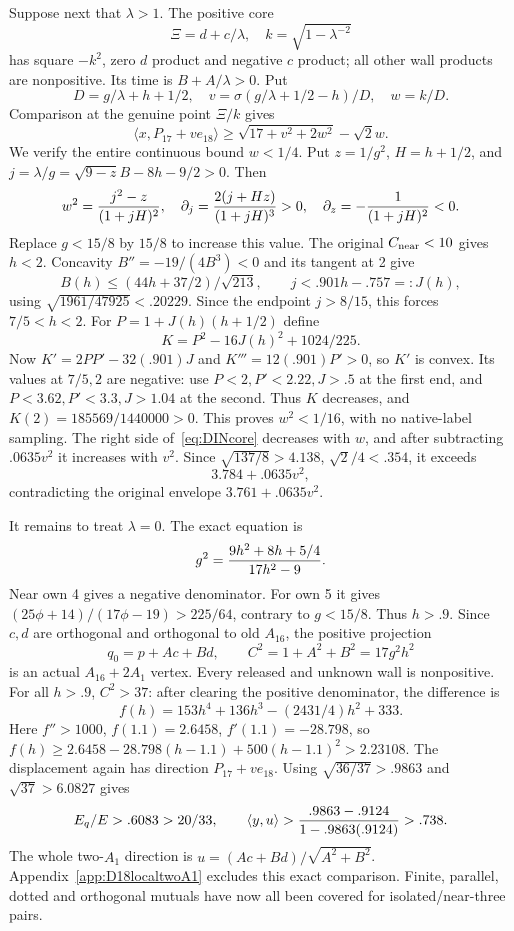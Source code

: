 \documentclass[11pt]{article}
\theoremstyle{definition}
\theoremstyle{remark}
\newcommand{\ip}[2]{\langle #1,#2\rangle}
\begin{document}
Suppose next that \(\lambda>1\).
The positive core
\[
 \Xi=d+c/\lambda,\quad k=\sqrt{1-\lambda^{-2}}
\]
has square \(-k^2\), zero \(d\) product and negative \(c\)
product; all other wall products are nonpositive.
Its time is \(B+A/\lambda>0\).
Put
\[
 D=g/\lambda+h+1/2,\quad
 v=\sigma(g/\lambda+1/2-h)/D,\quad w=k/D.
\]
Comparison at the genuine point \(\Xi/k\) gives
\[
 \ip x{P_{17}+ve_{18}}
 \ge\sqrt{17+v^2+2w^2}-\sqrt2w .
\tag{DINcore}\label{eq:DINcore}
\]
We verify the entire continuous bound \(w<1/4\).
Put \(z=1/g^2\), \(H=h+1/2\), and
\(j=\lambda/g=\sqrt{9-z}B-8h-9/2>0\).
Then
\[
 w^2={j^2-z\over(1+jH)^2},\quad
 \partial_j={2(j+Hz)\over(1+jH)^3}>0,\quad
 \partial_z=-{1\over(1+jH)^2}<0 .
\]
Replace \(g<15/8\) by \(15/8\) to increase this value.
The original \(C_{\rm near}<10\) gives \(h<2\).
Concavity \(B''=-19/(4B^3)<0\) and its tangent at 2 give
\[
 B(h)\le(44h+37/2)/\sqrt{213},\qquad
 j<.901h-.757=:J(h),
\]
using \(\sqrt{1961/47925}<.20229\).
Since the endpoint \(j>8/15\), this forces \(7/5<h<2\).
For \(P=1+J(h)(h+1/2)\) define
\[
 K=P^2-16J(h)^2+1024/225 .
\]
Now \(K'=2PP'-32(.901)J\) and
\(K'''=12(.901)P'>0\), so \(K'\) is convex.
Its values at \(7/5,2\) are negative:
use \(P<2,P'<2.22,J>.5\) at the first end,
and \(P<3.62,P'<3.3,J>1.04\) at the second.
Thus \(K\) decreases, and
\(K(2)=185569/1440000>0\).
This proves \(w^2<1/16\), with no native-label sampling.
The right side of~\eqref{eq:DINcore} decreases with \(w\),
and after subtracting \(.0635v^2\) it increases with \(v^2\).
Since \(\sqrt{137/8}>4.138\), \(\sqrt2/4<.354\), it exceeds
\[
                3.784+.0635v^2,
\]
contradicting the original envelope
\(3.761+.0635v^2\).

It remains to treat \(\lambda=0\).
The exact equation is
\[
 g^2={9h^2+8h+5/4\over17h^2-9}.
\]
Near own 4 gives a negative denominator.
For own 5 it gives
\((25\phi+14)/(17\phi-19)>225/64\), contrary to \(g<15/8\).
Thus \(h>.9\).
Since \(c,d\) are orthogonal and orthogonal to old \(A_{16}\),
the positive projection
\[
 q_0=p+Ac+Bd,\qquad C^2=1+A^2+B^2=17g^2h^2
\]
is an actual \(A_{16}+2A_1\) vertex.
Every released and unknown wall is nonpositive.
For all \(h>.9\), \(C^2>37\):
after clearing the positive denominator, the difference is
\[
 f(h)=153h^4+136h^3-(2431/4)h^2+333.
\]
Here \(f''>1000\), \(f(1.1)=2.6458\), \(f'(1.1)=-28.798\),
so
\(f(h)\ge2.6458-28.798(h-1.1)+500(h-1.1)^2
>2.23108\).
The displacement again has direction \(P_{17}+ve_{18}\).
Using \(\sqrt{36/37}>.9863\) and \(\sqrt{37}>6.0827\)
gives
\[
 E_q/E>.6083>20/33,\qquad
 \ip yu>{.9863-.9124\over1-.9863(.9124)}>.738 .
\]
The whole two-\(A_1\) direction is
\(u=(Ac+Bd)/\sqrt{A^2+B^2}\).
Appendix~\ref{app:D18localtwoA1} excludes this exact comparison.
Finite, parallel, dotted and orthogonal mutuals have now all been
covered for isolated/near-three pairs.
\end{document}
